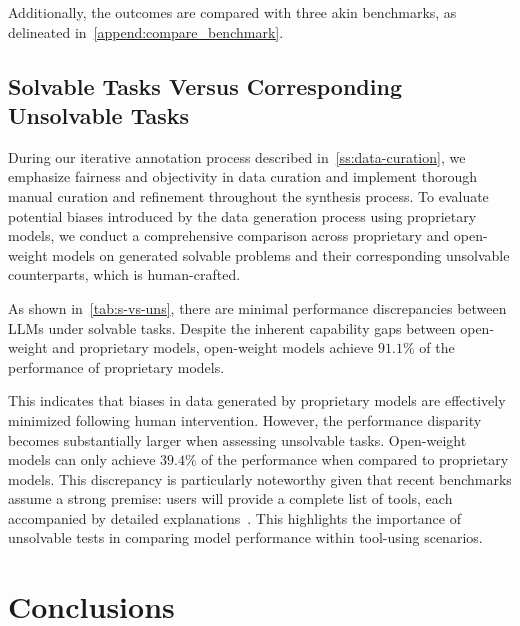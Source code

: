 \documentclass[11pt]{article}
\begin{document}
Additionally, the outcomes are compared with three akin benchmarks, as delineated in~\cref{append:compare_benchmark}.



\subsection{Solvable Tasks Versus Corresponding Unsolvable Tasks}
\label{append:solvable_test}

During our iterative annotation process described in~\cref{ss:data-curation}, we emphasize fairness and objectivity in data curation and implement thorough manual curation and refinement throughout the synthesis process.
To evaluate potential biases introduced by the data generation process using proprietary models, we conduct a comprehensive comparison across proprietary and open-weight models on generated solvable problems and their corresponding unsolvable counterparts, which is human-crafted.

As shown in~\cref{tab:s-vs-uns}, there are minimal performance discrepancies between LLMs under solvable tasks. 
Despite the inherent capability gaps between open-weight and proprietary models, open-weight models achieve $91.1\%$ of the performance of proprietary models.

This indicates that biases in data generated by proprietary models are effectively minimized following human intervention.
However, the performance disparity becomes substantially larger when assessing unsolvable tasks.
Open-weight models can only achieve $39.4\%$ of the performance when compared to proprietary models.
This discrepancy is particularly noteworthy given that recent benchmarks assume a strong premise: users will provide a complete list of tools, each accompanied by detailed explanations~\cite{DBLP:journals/corr/abs-2401-13178@agentboard,DBLP:journals/corr/abs-2307-16789@toolbench,DBLP:conf/nips/ZhuangYWSZ23@toolqa,DBLP:journals/corr/abs-2308-03688@agentbench}. 
This highlights the importance of unsolvable tests in comparing model performance within tool-using scenarios.

\section{Conclusions}
\label{conclusion}
\end{document}
